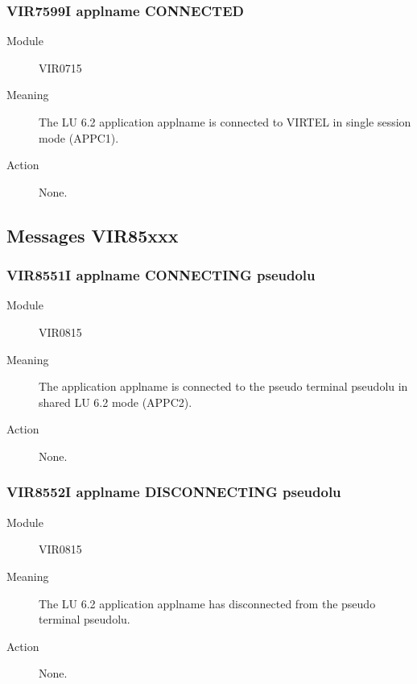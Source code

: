 \documentclass[letterpaper,10pt,english]{sphinxmanual}
\begin{document}
\subsubsection{VIR7599I applname CONNECTED}
\label{\detokenize{messages:vir7599i-applname-connected}}\begin{description}
\item[{Module}] \leavevmode
VIR0715

\item[{Meaning}] \leavevmode
The LU 6.2 application applname is connected to VIRTEL in single session mode (APPC1).

\item[{Action}] \leavevmode
None.

\end{description}


\subsection{Messages VIR85xxx}
\label{\detokenize{messages:messages-vir85xxx}}

\subsubsection{VIR8551I applname CONNECTING pseudolu}
\label{\detokenize{messages:vir8551i-applname-connecting-pseudolu}}\begin{description}
\item[{Module}] \leavevmode
VIR0815

\item[{Meaning}] \leavevmode
The application applname is connected to the pseudo terminal pseudolu in shared LU 6.2 mode (APPC2).

\item[{Action}] \leavevmode
None.

\end{description}


\subsubsection{VIR8552I applname DISCONNECTING pseudolu}
\label{\detokenize{messages:vir8552i-applname-disconnecting-pseudolu}}\begin{description}
\item[{Module}] \leavevmode
VIR0815

\item[{Meaning}] \leavevmode
The LU 6.2 application applname has disconnected from the pseudo terminal pseudolu.

\item[{Action}] \leavevmode
None.

\end{description}
\end{document}
